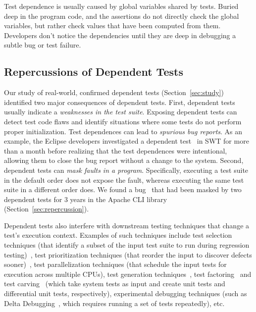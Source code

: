 Test dependence is usually caused by
global variables shared by tests.
Buried deep in the program code, and the assertions
do not directly check the global variables,
but rather check values that have been computed from
them.
Developers don't notice the dependencies until they are deep in debugging a
subtle bug or test failure.


\subsection{Repercussions of Dependent Tests}


Our study of \dtnum real-world, confirmed dependent
tests 
(Section~\ref{sec:study}) identified two 
major consequences of dependent tests.
%
First, dependent tests usually indicate a
\emph{weaknesses in the test suite}. Exposing
dependent tests can detect test code flaws and identify situations
where some tests do not perform proper initialization.
Test dependences can lead
to \emph{spurious bug reports}. As an example, the Eclipse developers
investigated a dependent test~\cite{eclipsebug} in SWT for
more than a month before realizing that the test dependences were intentional,
allowing them to close the bug report without a change to the system.
%
Second, dependent tests can
\emph{mask faults in a program}. Specifically, executing a test suite in the
default order does not expose the fault, whereas
executing the same test suite in a different order does. We found 
a bug~\cite{clibug} that had been masked by two dependent tests
for 3 years in the Apache CLI library~\cite{cli} (Section~\ref{sec:repercussion}).


Dependent tests also interfere with downstream testing
techniques that change a test's execution context.
Examples of such techniques include
test selection techniques (that identify a subset of
the input test suite to run during
regression testing)~\cite{harroldetal:OOPSLA:2001},
test prioritization techniques (that reorder the
input to discover defects sooner)~\cite{Elbaum:2000:PTC:347324.348910},
test parallelization techniques (that schedule the input tests for execution across multiple
CPUs), test generation techniques~\cite{PachecoLET2007, SPLAT},
test factoring~\cite{Saff:2005} and test carving~\cite{Elbaum:2006} (which take system tests as
input and create unit tests and differential unit tests,
respectively), experimental debugging techniques (such as Delta Debugging~\cite{Zeller:2002},
which requires running a set of tests repeatedly), etc. 


